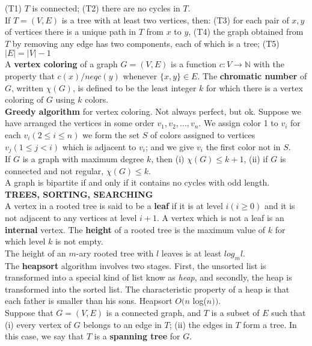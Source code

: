 \documentclass[10pt,landscape]{article}
\begin{document}
\begin{multicols}{4}
(T1) $T$ is connected; (T2) there are no cycles in $T$.\\
If $T = (V,E)$ is a tree with at least two vertices, then: (T3) for
each pair of $x,y$ of vertices there is a unique path in $T$ from $x$
to $y$, (T4) the graph obtained from $T$ by removing any edge has two
components, each of which is a tree; (T5) $|E| = |V|-1$\\
A \textbf{vertex coloring} of a graph $G = (V,E)$ is a function $c: V
\to \mathbb{N}$ with the property that $c(x) /neq c(y)$ whenever
$\{x,y\} \in E$. The \textbf{chromatic number} of $G$, written
$\chi(G)$, is defined to be the least integer $k$ for which there is a
vertex coloring of $G$ using $k$ colors.\\
\textbf{Greedy algorithm} for vertex coloring. Not always perfect, but
ok. Suppose we have arranged the vertices in some order $v_{1}, v_{2},
\dots ,v_{n}$. We assign color 1 to $v_{i}$ for each $v_{i}(2 \leq i
\leq n)$ we form the set $S$ of colors assigned to vertices $v_{j}(1
\leq j < i)$ which is adjacent to $v_{i}$; and we give $v_{i}$ the
first color not in $S$.\\
If $G$ is a graph with maximum degree $k$, then (i) $\chi(G) \leq k +
1$, (ii) if $G$ is connected and not regular, $\chi(G) \leq k$.\\
A graph is bipartite if and only if it contains no cycles with odd length.\\
\textbf{TREES, SORTING, SEARCHING}\\
A vertex in a rooted tree is said to be a \textbf{leaf} if it is at
level $i (i \geq 0)$ and it is not adjacent to any vertices at level
$i + 1$. A vertex which is not a leaf is an \textbf{internal}
vertex. The \textbf{height} of a rooted tree is the maximum value of
$k$ for which level $k$ is not empty.\\
The height of an $m$-ary rooted tree with $l$ leaves is at least
$log_{m}l$.\\
The \textbf{heapsort} algorithm involves two stages. First, the
unsorted list is transformed into a special kind of list know as
\textit{heap}, and secondly, the heap is transformed into the sorted
list. The characteristic property of a heap is that each father is
smaller than his sons. Heapsort $O(n$ log($n))$.\\
Suppose that $G = (V, E)$ is a connected graph, and $T$ is a subset of
$E$ such that (i) every vertex of $G$ belongs to an edge in $T$; (ii)
the edges in $T$ form a tree. In this case, we say that $T$ is a
\textbf{spanning tree} for $G$.\\

\end{multicols}
\end{document}
